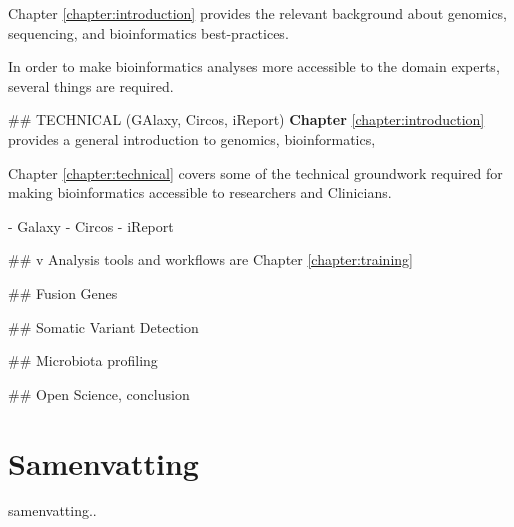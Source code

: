 Chapter \ref{chapter:introduction} provides the relevant background about genomics, sequencing, and bioinformatics best-practices.

In order to make bioinformatics analyses more accessible to the domain experts, several things are required.


## TECHNICAL (GAlaxy, Circos, iReport)
\textbf{Chapter} \ref{chapter:introduction} provides a general introduction to genomics, bioinformatics,

Chapter \ref{chapter:technical} covers some of the technical groundwork required for making bioinformatics accessible to researchers and Clinicians.

- Galaxy
- Circos
- iReport

## v
Analysis tools and workflows are Chapter \ref{chapter:training}

## Fusion Genes

## Somatic Variant Detection

## Microbiota profiling


## Open Science, conclusion


\chapter*{Samenvatting}

samenvatting..
